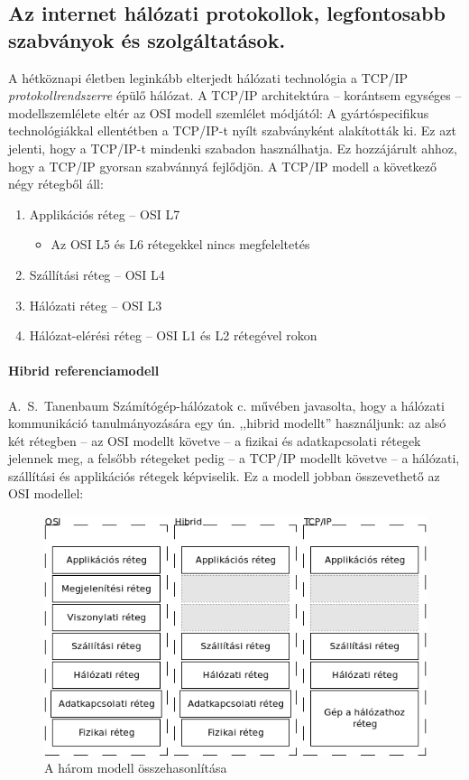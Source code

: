 \subsection{Az internet hálózati protokollok, legfontosabb szabványok és szolgáltatások.}
A hétköznapi életben leginkább elterjedt hálózati technológia a TCP/IP \emph{protokollrendszerre} épülő hálózat. A TCP/IP architektúra -- korántsem egységes -- modellszemlélete eltér az OSI modell szemlélet módjától:
A gyártóspecifikus technológiákkal ellentétben a TCP/IP-t nyílt szabványként alakították ki. Ez azt jelenti, hogy a TCP/IP-t mindenki szabadon használhatja. Ez hozzájárult ahhoz, hogy a TCP/IP gyorsan szabvánnyá fejlődjön.
A TCP/IP modell a következő négy rétegből áll:
\begin{enumerate}[nosep]
	\item Applikációs réteg -- OSI L7
	\begin{itemize}
		\item Az OSI L5 és L6 rétegekkel nincs megfeleltetés
	\end{itemize}
	\item Szállítási réteg -- OSI L4
	\item Hálózati réteg -- OSI L3
	\item Hálózat-elérési réteg -- OSI L1 és L2 rétegével rokon
\end{enumerate}
\paragraph{Hibrid referenciamodell}
A.~S.~Tanenbaum Számítógép-hálózatok c. művében javasolta, hogy a hálózati kommunikáció tanulmányozására egy ún. ,,hibrid modellt'' használjunk: az alsó két rétegben -- az OSI modellt követve -- a fizikai és adatkapcsolati rétegek jelennek meg, a felsőbb rétegeket pedig -- a TCP/IP modellt követve -- a hálózati, szállítási és applikációs rétegek képviselik. Ez a modell jobban összevethető az OSI modellel:
\begin{figure}[h]
	\centering
	\includegraphics[width=0.6\linewidth]{fig/7-Models}
	\caption{A három modell összehasonlítása}
	\label{fig:7-models}
\end{figure}



